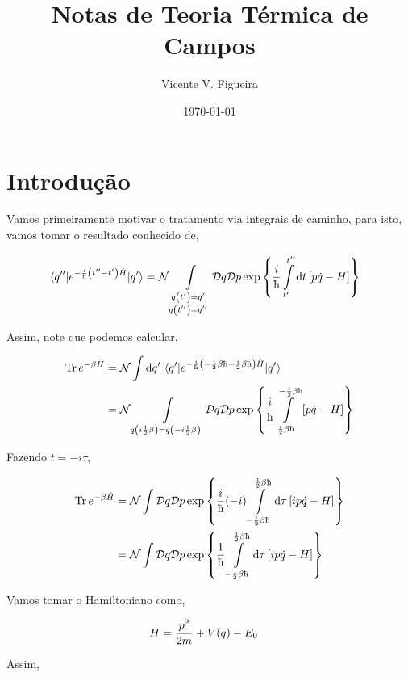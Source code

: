 \documentclass[twoside]{amsart}
\title{
Notas de Teoria Térmica de Campos
}
\author{
  Vicente V. Figueira
       }
\date{\today}
\newcommand{\Dd}[1]{\mathcal D #1}
\numberwithin{equation}{section}
\begin{document}
\maketitle

\tableofcontents


\section{Introdução}

Vamos primeiramente motivar o tratamento via integrais de caminho, para isto, vamos tomar o resultado conhecido de,

\begin{align}
    \mel{q''}{e^{-\frac{i}{\hbar}\qty(t''-t')\hat H}}{q'}&=\mathcal N\int\limits_{\substack{q\qty(t')=q'\\q\qty(t'')=q''}}\Dd{q}\Dd{p}\exp\qty{\frac i\hbar\int\limits_{t'}^{t''}\dd{t}\qty[p\dot q-H]}
\end{align}

Assim, note que podemos calcular,

\begin{align}
    \Tr e^{-\beta \hat H}&=\mathcal N\int\dd{q'}\mel{q'}{e^{-\frac i\hbar\qty(-\frac i2\beta \hbar-\frac i2\beta \hbar)\hat H}}{q'}\\
    &=\mathcal N\int\limits_{\substack{q\qty(i\frac12\beta)=q\qty(-i\frac12\beta)}}\Dd{q}\Dd{p}\exp\qty{\frac i\hbar\int\limits_{\frac i2\beta\hbar}^{-\frac i2\beta \hbar}\qty[p\dot q-H]}
\end{align}

Fazendo $t=-i\tau$,

\begin{align}
    \Tr e^{-\beta\hat H}&=\mathcal N\int\Dd{q}\Dd{p}\exp\qty{\frac i\hbar\qty(-i)\int\limits_{-\frac12\beta\hbar}^{\frac12\beta\hbar}\dd{\tau}\qty[ip\dot q-H]}\\
    &=\mathcal N\int\Dd{q}\Dd{p}\exp\qty{\frac1\hbar\int\limits_{-\frac12\beta\hbar}^{\frac12\beta\hbar}\dd{\tau}\qty[ip\dot q-H]}
\end{align}

Vamos tomar o Hamiltoniano como,

\begin{align}
    H&=\frac{p^2}{2m}+V\qty(q)-E_0
\end{align}

Assim,
\end{document}
